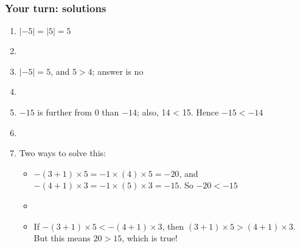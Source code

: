 \documentclass[12pt]{beamer}
\newcommand{\myframe}[1]{\begin{frame} \frametitle{#1}}
\begin{document}
\myframe{Your turn: solutions}
\begin{enumerate}
\item $|-5| = |5| = 5$
\item[]
\item $|-5| = 5$, and $5 > 4$; answer is no
\item[]
\item $-15$ is further from 0 than $-14$; also, 14 < 15. Hence $-15 < -14$
\item[]
\item Two ways to solve this:
\begin{itemize}
\item $-(3+1)\times 5 = -1\times(4)\times 5 = -20$, and $-(4+1)\times 3 = -1\times (5) \times 3 = -15$. So $-20 < -15$
\item[]
\item If $-(3+1)\times 5 < -(4+1)\times 3$, then $(3+1)\times 5 > (4+1)\times 3$. But this means $20 > 15$, which is true!
\end{itemize}
\end{enumerate}
\end{frame}
\end{document}
